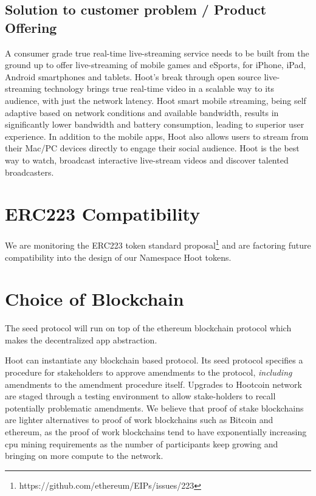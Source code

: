 \documentclass{article}
\begin{document}
\subsection{Solution to customer problem / Product Offering}
A consumer grade true real-time live-streaming service needs to be
built from the ground up to offer live-streaming of mobile games and eSports, for iPhone, iPad, Android smartphones and tablets. Hoot's break through open source live-streaming technology brings true real-time video in a scalable way to its audience, with just the network latency. Hoot smart mobile streaming, being self adaptive based on network conditions and available bandwidth, results in significantly lower bandwidth and battery consumption, leading to superior user experience. In addition to the mobile apps, Hoot also allows users to stream from their Mac/PC devices directly to engage their social audience. Hoot is the best way to watch, broadcast interactive live-stream videos and discover talented broadcasters.

%


\section{ERC223 Compatibility}
We are monitoring the ERC223 token standard proposal\footnote{https://github.com/ethereum/EIPs/issues/223} and are factoring future compatibility into the design of our Namespace Hoot tokens.

\section{Choice of Blockchain}
The seed protocol will run on top of the ethereum blockchain protocol which makes the decentralized app abstraction. 



Hoot can instantiate any blockchain based protocol. Its seed protocol specifies a procedure for stakeholders to approve amendments to the protocol, \emph{including} amendments to the amendment procedure itself. Upgrades to Hootcoin network are staged through a testing environment to allow stake-holders to recall potentially problematic amendments. We believe that proof of stake blockchains are lighter alternatives to proof of work blockchains such as Bitcoin and ethereum, as the proof of work blockchains tend to have exponentially increasing cpu mining requirements as the number of participants keep growing and bringing on more compute to the network.
\end{document}
